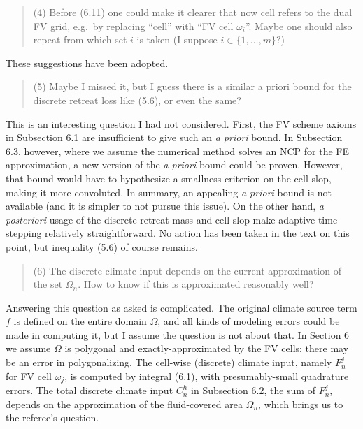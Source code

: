 \documentclass[12pt]{amsart}
\newcommand{\mm}{\medskip \noindent}
\begin{document}
\begin{quote}
\mm (4) Before (6.11) one could make it clearer that now cell refers to the dual FV grid, e.g.~by replacing ``cell'' with ``FV cell $\omega_i$''.  Maybe one should also repeat from which set $i$ is taken (I suppose $i \in \{1,\dots,m\}$?)
\end{quote}

These suggestions have been adopted.

\begin{quote}
\mm (5) Maybe I missed it, but I guess there is a similar a priori bound for the discrete retreat loss like (5.6), or even the same?
\end{quote}

This is an interesting question I had not considered.  First, the FV scheme axioms in Subsection 6.1 are insufficient to give such an \emph{a priori} bound.  In Subsection 6.3, however, where we assume the numerical method solves an NCP for the FE approximation, a new version of the \emph{a priori} bound could be proven.  However, that bound would have to hypothesize a smallness criterion on the cell slop, making it more convoluted.  In summary, an appealing \emph{a priori} bound is not available (and it is simpler to not pursue this issue).  On the other hand, \emph{a posteriori} usage of the discrete retreat mass and cell slop make adaptive time-stepping relatively straightforward.  No action has been taken in the text on this point, but inequality (5.6) of course remains.

\begin{quote}
\mm (6) The discrete climate input depends on the current approximation of the set $\Omega_n$.  How to know if this is approximated reasonably well?
\end{quote}

Answering this question as asked is complicated.  The original climate source term $f$ is defined on the entire domain $\Omega$, and all kinds of modeling errors could be made in computing it, but I assume the question is not about that.  In Section 6 we assume $\Omega$ is polygonal and exactly-approximated by the FV cells; there may be an error in polygonalizing.  The cell-wise (discrete) climate input, namely $F_n^j$ for FV cell $\omega_j$, is computed by integral (6.1), with presumably-small quadrature errors.  The total discrete climate input $C_n^h$ in Subsection 6.2, the sum of $F_n^j$, depends on the approximation of the fluid-covered area $\Omega_n$, which brings us to the referee's question.
\end{document}
